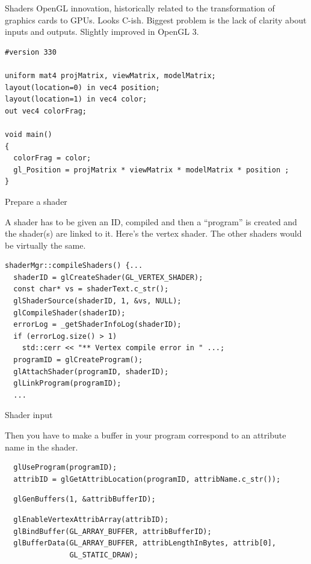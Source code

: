 \documentclass[12pt]{article}
\begin{document}
\begin{frame}[fragile]{Shaders}
OpenGL innovation, historically related to the transformation of
graphics cards to GPUs.  Looks C-ish.  Biggest problem is the lack of
clarity about inputs and outputs.  Slightly improved in OpenGL 3.

\begin{verbatim}
#version 330

uniform mat4 projMatrix, viewMatrix, modelMatrix;
layout(location=0) in vec4 position;
layout(location=1) in vec4 color;
out vec4 colorFrag;

void main()
{
  colorFrag = color;
  gl_Position = projMatrix * viewMatrix * modelMatrix * position ;
}
\end{verbatim}
\end{frame}

\begin{frame}[fragile]{Prepare a shader}

A shader has to be given an ID, compiled and then a ``program'' is
created and the shader(s) are linked to it.  Here's the vertex shader.
The other shaders would be virtually the same.

\begin{verbatim}
shaderMgr::compileShaders() {...
  shaderID = glCreateShader(GL_VERTEX_SHADER);
  const char* vs = shaderText.c_str();
  glShaderSource(shaderID, 1, &vs, NULL);
  glCompileShader(shaderID);
  errorLog = _getShaderInfoLog(shaderID);
  if (errorLog.size() > 1)
    std::cerr << "** Vertex compile error in " ...;
  programID = glCreateProgram();
  glAttachShader(programID, shaderID);
  glLinkProgram(programID);
  ...
\end{verbatim}
\end{frame}


\begin{frame}[fragile]{Shader input}

Then you have to make a buffer in your program correspond to an attribute name in
the shader.

\begin{verbatim}
  glUseProgram(programID);
  attribID = glGetAttribLocation(programID, attribName.c_str());
\end{verbatim}

\begin{verbatim}
  glGenBuffers(1, &attribBufferID);
\end{verbatim}


\begin{verbatim}
  glEnableVertexAttribArray(attribID);
  glBindBuffer(GL_ARRAY_BUFFER, attribBufferID);
  glBufferData(GL_ARRAY_BUFFER, attribLengthInBytes, attrib[0],
               GL_STATIC_DRAW);


\end{verbatim}
\end{frame}
\end{document}
